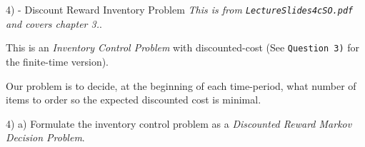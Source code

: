 \documentclass[11pt,a4paper]{article}
\begin{document}
\begin{question}{4) - Discount Reward Inventory Problem}
  \textit{This is from \texttt{LectureSlides4cSO.pdf} and covers chapter 3.}.
  \par This is an \textit{Inventory Control Problem} with discounted-cost (See \texttt{Question 3)} for the finite-time version).
  \par Our problem is to decide, at the beginning of each time-period, what number of items to order so the expected discounted cost is minimal.
\end{question}

\begin{question}{4) a)}
  Formulate the inventory control problem as a \textit{Discounted Reward Markov Decision Problem}.
\end{question}
\end{document}
